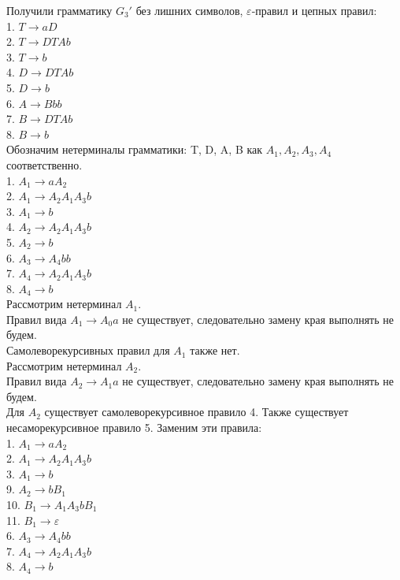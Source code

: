 \documentclass[a4paper,14pt]{extarticle}
\begin{document}
\begin{enumerate}[1.]
Получили грамматику $G_3'$ без лишних символов, $\varepsilon$-правил и цепных правил:\\
1. $T \rightarrow aD$\\
2. $T \rightarrow DTAb$\\
3. $T \rightarrow b$\\
4. $D \rightarrow DTAb$\\
5. $D \rightarrow b$\\
6. $A \rightarrow Bbb$\\
7. $B \rightarrow DTAb$\\
8. $B \rightarrow b$\\

Обозначим нетерминалы грамматики: T, D, A, B как $A_1, A_2, A_3, A_4$ соответственно.\\
1. $A_1 \rightarrow aA_2$\\
2. $A_1 \rightarrow A_2A_1A_3b$\\
3. $A_1 \rightarrow b$\\
4. $A_2 \rightarrow A_2A_1A_3b$\\
5. $A_2 \rightarrow b$\\
6. $A_3 \rightarrow A_4bb$\\
7. $A_4 \rightarrow A_2A_1A_3b$\\
8. $A_4 \rightarrow b$\\

Рассмотрим нетерминал $A_1$.\\
Правил вида $A_1 \rightarrow A_0a$ не существует, 
следовательно замену края выполнять не будем.\\
Самолеворекурсивных правил для $A_1$ также нет.\\

Рассмотрим нетерминал $A_2$.\\
Правил вида $A_2 \rightarrow A_1a$ не существует, 
следовательно замену края выполнять не будем.\\
Для $A_2$ существует самолеворекурсивное правило 4. 
Также существует несаморекурсивное правило 5. 
Заменим эти правила:\\
1. $A_1 \rightarrow aA_2$\\
2. $A_1 \rightarrow A_2A_1A_3b$\\
3. $A_1 \rightarrow b$\\
9. $A_2 \rightarrow bB_1$\\
10. $B_1 \rightarrow A_1A_3bB_1$\\
11. $B_1 \rightarrow \varepsilon$\\
6. $A_3 \rightarrow A_4bb$\\
7. $A_4 \rightarrow A_2A_1A_3b$\\
8. $A_4 \rightarrow b$\\


\end{enumerate}
\end{document}
